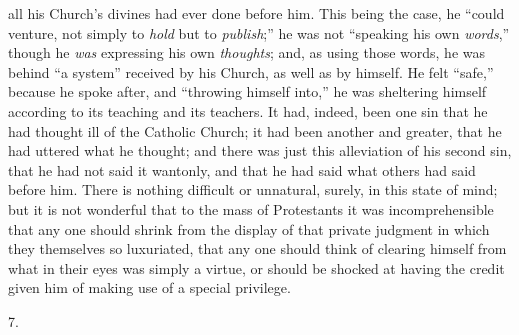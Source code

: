 all his Church's divines had ever done before him. This being the
case, he ``could venture, not simply to \emph{hold} but to \emph{publish};''
he was not ``speaking his own \emph{words},'' though he \emph{was}
expressing his own \emph{thoughts}; and, as using those words, he was
behind ``a system'' received by his Church, as well as by
himself. He felt ``safe,'' because he spoke after, and
``throwing himself into,'' he was sheltering himself according
to its teaching and its teachers. It had, indeed, been one sin that he
had thought ill of the Catholic Church; it had been another and
greater, that he had uttered what he thought; and there was just this
alleviation of his second sin, that he had not said it wantonly, and
that he had said what others had said before him. There is nothing
difficult or unnatural, surely, in this state of mind; but it is not
wonderful that to the mass of Protestants it was incomprehensible that
any one should shrink from the display of that private judgment in
which they themselves so luxuriated, that any one should think of
clearing himself from what in their eyes was simply a virtue, or
should be shocked at having the credit given him of making use of a
special privilege.

7.

